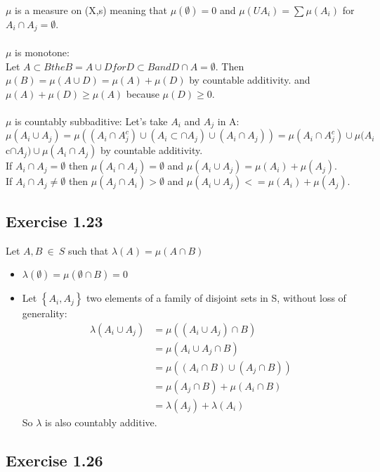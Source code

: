 \documentclass[11pt]{article}
\numberwithin{equation}{section}
\theoremstyle{plain}
\theoremstyle{definition}
\newcommand\braces[1]{\left\{ #1 \right\}}
\def\ss{\subset}
\newcommand{\1}{\mathbbm 1}
\def\l{\lambda}
\begin{document}
\noindent $\mu$ is a measure on (X,s) meaning that $\mu(\emptyset)=0$ and $\mu(UA_i) = \sum \mu(A_i)$ for $A_i \cap A_j = \emptyset$. 
\\
\\
$\mu$ is monotone:\\ 
Let $A \ss B the B = A \cup D for D \ss B and D \cap A = \emptyset$. Then $\mu(B) = \mu(A \cup D) = \mu(A) + \mu(D)$ by countable additivity. and $\mu(A) + \mu(D) \geq \mu(A)$ because $\mu(D) \geq 0$. 
\\
\\
$\mu$ is countably subbaditive: Let's take $A_i$ and $A_j$ in A:
\\
$\mu(A_i \cup A_j) = \mu((A_i \cap A_j^c) \cup (A_i \ss \cap A_j) \cup (A_i \cap A_j)) = \mu(A_i \cap A_j^c) \cup \mu(A_i$c$ \cap A_j) \cup \mu(A_i \cap A_j)$ by countable additivity. \\
If $A_i \cap A_j = \emptyset$ then $\mu(A_i \cap A_j) = \emptyset$ and $\mu(A_i \cup A_j) = \mu(A_i) + \mu(A_j)$. 
\\
If $A_i \cap A_j \neq \emptyset$ then $\mu(A_j \cap A_i) > \emptyset$ and $\mu(A_i \cup A_j) <= \mu(A_i) + \mu(A_j)$. 



\subsection*{Exercise 1.23} %


Let $A,B \ \in \ S $ such that $\l (A) = \mu(A\cap B)$
\begin{itemize}
	\item $\l (\emptyset) = \mu( \emptyset \cap B) = 0 $
	\item Let $\braces{A_i, A_j}$ two elements of a family of disjoint sets in S, without loss of generality:
	\begin{align*}
	\l (A_i \cup A_j) &= \mu((A_i \cup A_j) \cap B)\\
					&= \mu(A_i \cup A_j \cap B)\\
					&= \mu((A_i \cap B) \cup (A_j \cap B)) \\
					&= \mu(A_j \cap B) + \mu(A_i \cap B)\\
					&= \l(A_j) + \l(A_i)
	\end{align*}
	\noindent So $\l$ is also countably additive.
	
\end{itemize}


\subsection*{Exercise 1.26} %
\end{document}
